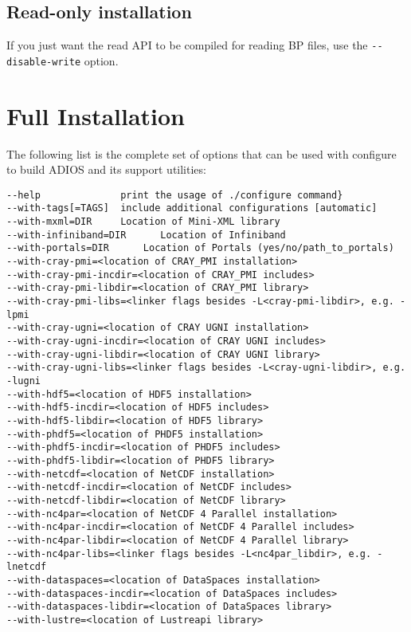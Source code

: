 
\subsection{Read-only installation}

If you just want the read API to be compiled for reading BP files, use the \verb+--disable-write+ option.

\section{Full Installation}

The following list is the complete set of options that can be used with 
configure to build ADIOS and its support utilities:

\begin{lstlisting}
--help              print the usage of ./configure command}
--with-tags[=TAGS]  include additional configurations [automatic]
--with-mxml=DIR     Location of Mini-XML library
--with-infiniband=DIR      Location of Infiniband
--with-portals=DIR      Location of Portals (yes/no/path_to_portals)
--with-cray-pmi=<location of CRAY_PMI installation>
--with-cray-pmi-incdir=<location of CRAY_PMI includes>
--with-cray-pmi-libdir=<location of CRAY_PMI library>
--with-cray-pmi-libs=<linker flags besides -L<cray-pmi-libdir>, e.g. -lpmi
--with-cray-ugni=<location of CRAY UGNI installation>
--with-cray-ugni-incdir=<location of CRAY UGNI includes>
--with-cray-ugni-libdir=<location of CRAY UGNI library>
--with-cray-ugni-libs=<linker flags besides -L<cray-ugni-libdir>, e.g. -lugni
--with-hdf5=<location of HDF5 installation>
--with-hdf5-incdir=<location of HDF5 includes>
--with-hdf5-libdir=<location of HDF5 library>
--with-phdf5=<location of PHDF5 installation>
--with-phdf5-incdir=<location of PHDF5 includes>
--with-phdf5-libdir=<location of PHDF5 library>
--with-netcdf=<location of NetCDF installation>
--with-netcdf-incdir=<location of NetCDF includes>
--with-netcdf-libdir=<location of NetCDF library>
--with-nc4par=<location of NetCDF 4 Parallel installation>
--with-nc4par-incdir=<location of NetCDF 4 Parallel includes>
--with-nc4par-libdir=<location of NetCDF 4 Parallel library>
--with-nc4par-libs=<linker flags besides -L<nc4par_libdir>, e.g. -lnetcdf
--with-dataspaces=<location of DataSpaces installation>
--with-dataspaces-incdir=<location of DataSpaces includes>
--with-dataspaces-libdir=<location of DataSpaces library>
--with-lustre=<location of Lustreapi library>
\end{lstlisting}

